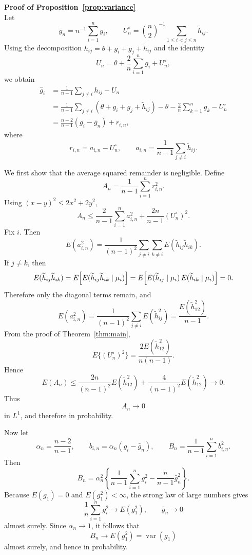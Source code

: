 \documentclass[10pt]{article}
\begin{document}
\vspace{1cm}
\noindent \textbf{Proof of Proposition~\ref{prop:variance}}\\
Let
\[
\bar g_n=n^{-1}\sum_{i=1}^n g_i,
\qquad
U_n^{\circ}
=
\binom{n}{2}^{-1}\sum_{1\leq i<j\leq n}\widetilde h_{ij}.
\]
Using the decomposition $h_{ij}=\theta+g_i+g_j+\widetilde h_{ij}$ and the identity
\[
U_n=\theta+\frac{2}{n}\sum_{i=1}^n g_i+U_n^{\circ},
\]
we obtain
\begin{align*}
\widehat g_i
&=
\frac{1}{n-1}\sum_{j\neq i}h_{ij}-U_n\\
&=
\frac{1}{n-1}\sum_{j\neq i}(\theta+g_i+g_j+\widetilde h_{ij})
-
\theta-\frac{2}{n}\sum_{k=1}^n g_k-U_n^{\circ}\\
&=
\frac{n-2}{n-1}(g_i-\bar g_n)
+
r_{i,n},
\end{align*}
where
\[
r_{i,n}
=
a_{i,n}-U_n^{\circ},
\qquad
a_{i,n}
=
\frac{1}{n-1}\sum_{j\neq i}\widetilde h_{ij}.
\]

We first show that the average squared remainder is negligible. Define
\[
A_n=\frac{1}{n-1}\sum_{i=1}^n r_{i,n}^2.
\]
Using $(x-y)^2\leq 2x^2+2y^2$,
\[
A_n
\leq
\frac{2}{n-1}\sum_{i=1}^n a_{i,n}^2
+
\frac{2n}{n-1}(U_n^{\circ})^2.
\]
Fix $i$. Then
\[
E(a_{i,n}^2)
=
\frac{1}{(n-1)^2}
\sum_{j\neq i}\sum_{k\neq i}E(\widetilde h_{ij}\widetilde h_{ik}).
\]
If $j\neq k$, then
\[
E(\widetilde h_{ij}\widetilde h_{ik})
=
E\Bigl[E(\widetilde h_{ij}\widetilde h_{ik}\mid \mu_i)\Bigr]
=
E\Bigl[E(\widetilde h_{ij}\mid \mu_i)\,E(\widetilde h_{ik}\mid \mu_i)\Bigr]
=
0.
\]
Therefore only the diagonal terms remain, and
\[
E(a_{i,n}^2)
=
\frac{1}{(n-1)^2}
\sum_{j\neq i}E(\widetilde h_{ij}^2)
=
\frac{E(\widetilde h_{12}^2)}{n-1}.
\]
From the proof of Theorem~\ref{thm:main},
\[
E\bigl\{(U_n^{\circ})^2\bigr\}
=
\frac{2E(\widetilde h_{12}^2)}{n(n-1)}.
\]
Hence
\[
E(A_n)
\leq
\frac{2n}{(n-1)^2}E(\widetilde h_{12}^2)
+
\frac{4}{(n-1)^2}E(\widetilde h_{12}^2)
\to 0.
\]
Thus
\[
A_n\to 0
\]
in $L^1$, and therefore in probability.

Now let
\[
\alpha_n=\frac{n-2}{n-1},
\qquad
b_{i,n}=\alpha_n(g_i-\bar g_n),
\qquad
B_n=\frac{1}{n-1}\sum_{i=1}^n b_{i,n}^2.
\]
Then
\[
B_n
=
\alpha_n^2\left\{
\frac{1}{n-1}\sum_{i=1}^n g_i^2
-
\frac{n}{n-1}\bar g_n^2
\right\}.
\]
Because $E(g_1)=0$ and $E(g_1^2)<\infty$, the strong law of large numbers gives
\[
\frac{1}{n}\sum_{i=1}^n g_i^2\to E(g_1^2),
\qquad
\bar g_n\to 0
\]
almost surely. Since $\alpha_n\to 1$, it follows that
\[
B_n\to E(g_1^2)=\operatorname{var}(g_1)
\]
almost surely, and hence in probability.
\end{document}
